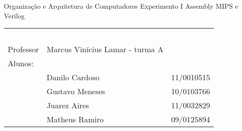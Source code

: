 \documentclass[a4paper,11pt]{article}
\begin{document}
\MakeMyTitlePage
{Organização e Arquitetura de Computadores}
{Experimento I}
{Assembly MIPS e Verilog}
{%
		\begin{tabular}{llr} \
		& & \\[0.05cm]		
		Professor & Marcus Vinícius Lamar - turma A & \\
		
		Alunos:& & \\
	&	 Danilo Cardoso   			& 11/0010515 \\
	&	 Gustavo Meneses   			& 10/0103766 \\
	&	 Juarez Aires   			& 11/0032829\\ 
	&	 Matheus Ramiro   			& 09/0125894 \\
	[0.05cm]	
		\end{tabular}
}




\end{document}
